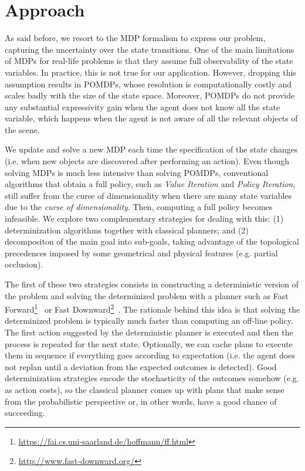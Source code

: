 \documentclass[../root.tex]{subfiles}
\begin{document}
\section{Approach}

As said before, we resort to the MDP
formalism to express our problem, capturing the uncertainty over
the state transitions.
One of the main limitations of MDPs for
real-life problems is that they assume full observability of the state variables.
In practice, this is not true for our application. However, dropping this
assumption results in POMDPs, whose resolution is computationally costly
and scales badly with the size of the state space. Moreover, POMDPs do
not provide any substantial expressivity gain when the agent does not know all
the state variable, which happens when the agent is not aware of all
the relevant objects of the scene.

We update and solve a new MDP each
time the specification of the state changes (i.e. when new objects are discovered
after performing an action).
Even though solving MDPs is much less intensive than
solving POMDPs, conventional algorithms that obtain a full policy, such
as \emph{Value Iteration} and
\emph{Policy Iteration}, still suffer from the curse of dimensionality when there
are many state variables due to the \emph{curse of dimensionality}.
Then, computing a full policy becomes infeasible.
We explore two complementary strategies for dealing with this: (1)
determinization algorithms together with classical planners; and (2)
decompositon of the main goal into sub-goals, taking advantage of the
topological precedences imposed by some geometrical
and physical features (e.g. partial occlusion).

The first of these two strategies consists in constructing a deterministic
version of the problem and solving the determinized problem with a planner
such as Fast Forward\footnote{%
\url{https://fai.cs.uni-saarland.de/hoffmann/ff.html}}~\cite{hoffman2001ff} or
Fast Downward\footnote{\url{http://www.fast-downward.org/}}~\cite{helmert2006fast}.
The rationale behind this idea is that solving the determinized problem
is typically much faster than computing an off-line policy. The first
action suggested by the deterministic planner is executed and then the process
is repeated for the next state. Optionally, we can cache plans to
execute them in sequence if everything goes according to expectation (i.e.
the agent does not replan until a deviation from the expected outcomes is
detected).
Good determinization strategies encode the stochasticity of the outcomes
somehow (e.g. as action costs), so the classical planner comes up with plans
that make sense from the probabilistic perspective or, in other words, have
a good chance of succeeding.
\end{document}

